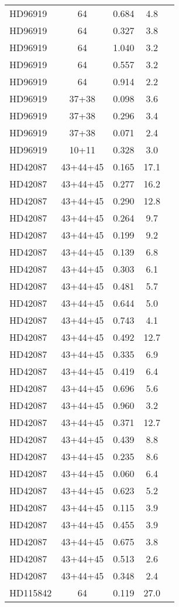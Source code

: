 \begin{table*}
\begin{tabular}{l c c c c}
HD96919 & 64 & 0.684 & 4.8\\ 
HD96919 & 64 & 0.327 & 3.8\\ 
HD96919 & 64 & 1.040 & 3.2\\ 
HD96919 & 64 & 0.557 & 3.2\\ 
HD96919 & 64 & 0.914 & 2.2\\ 
HD96919 & 37+38 & 0.098 & 3.6\\ 
HD96919 & 37+38 & 0.296 & 3.4\\ 
HD96919 & 37+38 & 0.071 & 2.4\\ 
HD96919 & 10+11 & 0.328 & 3.0\\ 
\hline
HD42087 & 43+44+45 & 0.165 & 17.1\\ 
HD42087 & 43+44+45 & 0.277 & 16.2\\ 
HD42087 & 43+44+45 & 0.290 & 12.8\\ 
HD42087 & 43+44+45 & 0.264 & 9.7\\ 
HD42087 & 43+44+45 & 0.199 & 9.2\\ 
HD42087 & 43+44+45 & 0.139 & 6.8\\ 
HD42087 & 43+44+45 & 0.303 & 6.1\\ 
HD42087 & 43+44+45 & 0.481 & 5.7\\ 
HD42087 & 43+44+45 & 0.644 & 5.0\\ 
HD42087 & 43+44+45 & 0.743 & 4.1\\ 
HD42087 & 43+44+45 & 0.492 & 12.7\\ 
HD42087 & 43+44+45 & 0.335 & 6.9\\ 
HD42087 & 43+44+45 & 0.419 & 6.4\\ 
HD42087 & 43+44+45 & 0.696 & 5.6\\ 
HD42087 & 43+44+45 & 0.960 & 3.2\\ 
HD42087 & 43+44+45 & 0.371 & 12.7\\ 
HD42087 & 43+44+45 & 0.439 & 8.8\\ 
HD42087 & 43+44+45 & 0.235 & 8.6\\ 
HD42087 & 43+44+45 & 0.060 & 6.4\\ 
HD42087 & 43+44+45 & 0.623 & 5.2\\ 
HD42087 & 43+44+45 & 0.115 & 3.9\\ 
HD42087 & 43+44+45 & 0.455 & 3.9\\ 
HD42087 & 43+44+45 & 0.675 & 3.8\\ 
HD42087 & 43+44+45 & 0.513 & 2.6\\ 
HD42087 & 43+44+45 & 0.348 & 2.4\\ 
\hline
HD115842 & 64 & 0.119 & 27.0\\ 

\end{tabular}
\end{table*}
